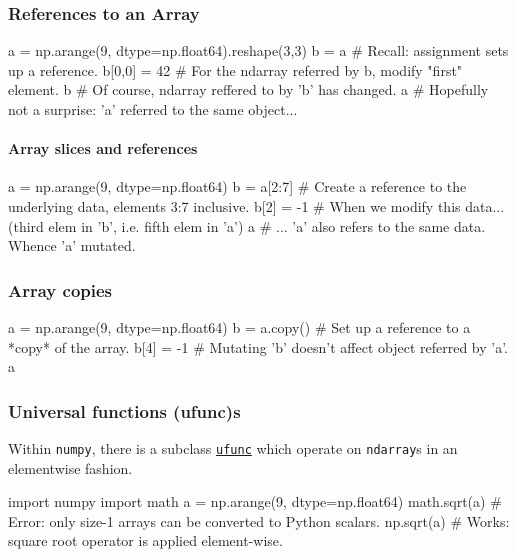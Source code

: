 \documentclass[12pt,letterpaper,twoside]{article}
\begin{document}
\subsubsection{References to an Array}

\begin{python}
a = np.arange(9, dtype=np.float64).reshape(3,3)
b = a         # Recall: assignment sets up a reference.
b[0,0] = 42   # For the ndarray referred by b, modify "first" element.
b             # Of course, ndarray reffered to by 'b' has changed.
a             # Hopefully not a surprise: 'a' referred to the same object...
\end{python}

\paragraph{Array slices and references}

\begin{python}
a = np.arange(9, dtype=np.float64)
b = a[2:7]    # Create a reference to the underlying data, elements 3:7 inclusive.
b[2] = -1     # When we modify this data... (third elem in 'b', i.e. fifth elem in 'a')
a             # ... 'a' also refers to the same data. Whence 'a' mutated.
\end{python}

\hypertarget{array-copies}{%
\subsubsection{Array copies}\label{array-copies}}

\begin{python}
a = np.arange(9, dtype=np.float64)
b = a.copy()       # Set up a reference to a *copy* of the array.
b[4] = -1          # Mutating 'b' doesn't affect object referred by 'a'.
a
\end{python}

\subsubsection{Universal functions (ufunc)s}

Within \texttt{numpy}, there is a subclass
\href{https://docs.scipy.org/doc/numpy-1.15.1/reference/ufuncs.html#universal-functions-ufunc}
{\texttt{ufunc}} which operate on \texttt{ndarray}s in an elementwise fashion.
\begin{python}
import numpy
import math
a = np.arange(9, dtype=np.float64)
math.sqrt(a)   # Error: only size-1 arrays can be converted to Python scalars.
np.sqrt(a)     # Works: square root operator is applied element-wise.
\end{python}
\end{document}
